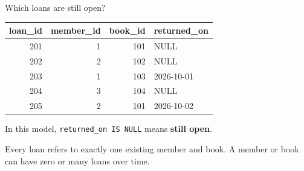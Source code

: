 \begin{frame}[t]{Which loans are still open?}
\small\centering\begin{tabular}{rrrl}\toprule
loan\_id & member\_id & book\_id & returned\_on\\\midrule
201 & 1 & 101 & NULL\\202 & 2 & 102 & NULL\\
203 & 1 & 103 & 2026-10-01\\204 & 3 & 104 & NULL\\
205 & 2 & 101 & 2026-10-02\\\bottomrule\end{tabular}
\par\vspace{4mm}\raggedright\normalsize
In this model, \texttt{returned\_on IS NULL} means \textbf{still open}.\par
\smallskip Every loan refers to exactly one existing member and book.
A member or book can have zero or many loans over time.
\end{frame}

